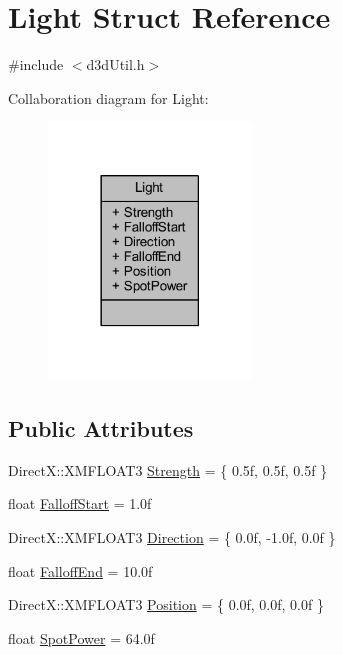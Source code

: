 \hypertarget{struct_light}{}\section{Light Struct Reference}
\label{struct_light}


{\ttfamily \#include $<$d3d\+Util.\+h$>$}



Collaboration diagram for Light\+:\nopagebreak
\begin{figure}[H]
\begin{center}
\leavevmode
\includegraphics[width=153pt]{struct_light__coll__graph}
\end{center}
\end{figure}
\subsection*{Public Attributes}
\begin{DoxyCompactItemize}
\item 
Direct\+X\+::\+X\+M\+F\+L\+O\+A\+T3 \hyperlink{struct_light_a015096e9847bd33050b73a13c200a4c1_a015096e9847bd33050b73a13c200a4c1}{Strength} = \{ 0.\+5f, 0.\+5f, 0.\+5f \}
\item 
float \hyperlink{struct_light_a21cc24ec9f914edbbc090bb3460fc645_a21cc24ec9f914edbbc090bb3460fc645}{Falloff\+Start} = 1.\+0f
\item 
Direct\+X\+::\+X\+M\+F\+L\+O\+A\+T3 \hyperlink{struct_light_afd9b6884af30b8fdc7fee9a982572a0f_afd9b6884af30b8fdc7fee9a982572a0f}{Direction} = \{ 0.\+0f, -\/1.\+0f, 0.\+0f \}
\item 
float \hyperlink{struct_light_a38fa90b8cea6b266b13c3dc865828a14_a38fa90b8cea6b266b13c3dc865828a14}{Falloff\+End} = 10.\+0f
\item 
Direct\+X\+::\+X\+M\+F\+L\+O\+A\+T3 \hyperlink{struct_light_a759c2228a71bfc669460ae4210a48e52_a759c2228a71bfc669460ae4210a48e52}{Position} = \{ 0.\+0f, 0.\+0f, 0.\+0f \}
\item 
float \hyperlink{struct_light_a7202d90f1b073d3ac170c18451f0bc92_a7202d90f1b073d3ac170c18451f0bc92}{Spot\+Power} = 64.\+0f
\end{DoxyCompactItemize}


